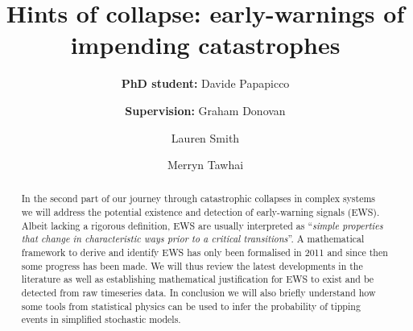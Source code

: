 \documentclass[dvipsnames, table, 11pt]{article}
\begin{document}
     \title{Hints of collapse: early-warnings of impending catastrophes}

     \author[*]{\textbf{PhD student:} Davide Papapicco}
     \author[*]{\authorcr \textbf{Supervision:} Graham Donovan}
     \author[*]{Lauren Smith}
     \author[$\dagger$]{Merryn Tawhai}

 
     \date{}

     \maketitle

     \begin{abstract}
             In the second part of our journey through catastrophic collapses in complex systems we will address the potential existence and detection of early-warning signals (EWS).
             Albeit lacking a rigorous definition, EWS are usually interpreted as ``\textit{simple properties that change in characteristic ways prior to a critical transitions}''.
             A mathematical framework to derive and identify EWS has only been formalised in 2011 and since then some progress has been made.
             We will thus review the latest developments in the literature as well as establishing mathematical justification for EWS to exist and be detected from raw timeseries data.
             In conclusion we will also briefly understand how some tools from statistical physics can be used to infer the probability of tipping events in simplified stochastic models.
     \end{abstract}
\end{document}
